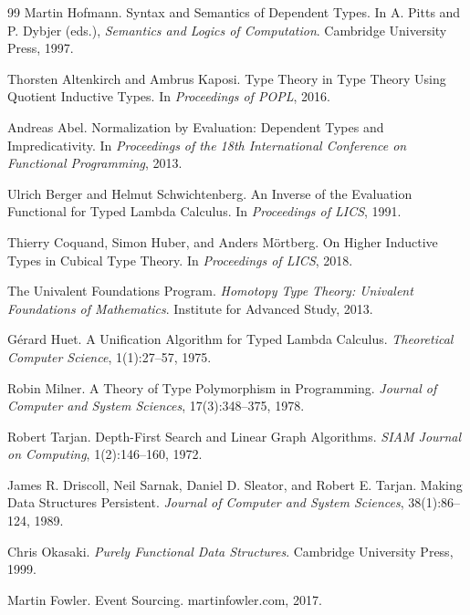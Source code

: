 \documentclass[12pt,oneside]{article}
\theoremstyle{definition}
\theoremstyle{remark}
\begin{document}
\begin{thebibliography}{99}
Martin Hofmann.
\newblock Syntax and Semantics of Dependent Types.
\newblock In A. Pitts and P. Dybjer (eds.),
\emph{Semantics and Logics of Computation}.
Cambridge University Press, 1997.

Thorsten Altenkirch and Ambrus Kaposi.
\newblock Type Theory in Type Theory Using Quotient Inductive Types.
\newblock In \emph{Proceedings of POPL}, 2016.

Andreas Abel.
\newblock Normalization by Evaluation: Dependent Types and Impredicativity.
\newblock In \emph{Proceedings of the 18th International Conference on Functional Programming}, 2013.

Ulrich Berger and Helmut Schwichtenberg.
\newblock An Inverse of the Evaluation Functional for Typed Lambda Calculus.
\newblock In \emph{Proceedings of LICS}, 1991.

Thierry Coquand, Simon Huber, and Anders Mörtberg.
\newblock On Higher Inductive Types in Cubical Type Theory.
\newblock In \emph{Proceedings of LICS}, 2018.

The Univalent Foundations Program.
\newblock \emph{Homotopy Type Theory: Univalent Foundations of Mathematics}.
\newblock Institute for Advanced Study, 2013.

Gérard Huet.
\newblock A Unification Algorithm for Typed Lambda Calculus.
\newblock \emph{Theoretical Computer Science}, 1(1):27--57, 1975.

Robin Milner.
\newblock A Theory of Type Polymorphism in Programming.
\newblock \emph{Journal of Computer and System Sciences}, 17(3):348--375, 1978.

Robert Tarjan.
\newblock Depth-First Search and Linear Graph Algorithms.
\newblock \emph{SIAM Journal on Computing}, 1(2):146--160, 1972.

James R. Driscoll, Neil Sarnak, Daniel D. Sleator, and Robert E. Tarjan.
\newblock Making Data Structures Persistent.
\newblock \emph{Journal of Computer and System Sciences}, 38(1):86--124, 1989.

Chris Okasaki.
\newblock \emph{Purely Functional Data Structures}.
\newblock Cambridge University Press, 1999.

Martin Fowler.
\newblock Event Sourcing.
\newblock martinfowler.com, 2017.


\end{thebibliography}
\end{document}
